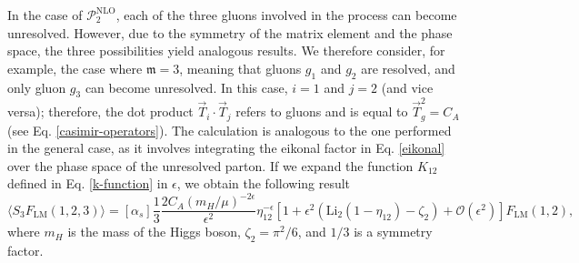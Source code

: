 \documentclass[a4paper, 12pt]{book}
\newcommand{\um}{\mathfrak{m}}
\begin{document}
In the case of $\mathcal{P}_{2}^{\mathrm{NLO}}$, each of the three gluons involved in the process can become unresolved. However, due to the symmetry of the matrix element and the phase space, the three possibilities yield analogous results. We therefore consider, for example, the case where $\um=3$, meaning that gluons $g_1$ and $g_2$ are resolved, and only gluon $g_3$ can become unresolved. In this case, $i=1$ and $j=2$ (and vice versa); therefore, the dot product $\vec{T}_i \cdot \vec{T}_j$ refers to gluons and is equal to $\vec{T}_g^2 = C_A$ (see Eq. \ref{casimir-operators}). The calculation is analogous to the one performed in the general case, as it involves integrating the eikonal factor in Eq. \ref{eikonal} over the phase space of the unresolved parton. If we expand the function $K_{12}$ defined in Eq. \ref{k-function} in $\epsilon$, we obtain the following result
\begin{equation}
  \langle S_3 F_\mathrm{LM}(1,2,3) \rangle = [\alpha_s] \frac{1}{3} \frac{2 C_A (m_H/\mu)^{-2 \epsilon}}{\epsilon^2} \eta_{12}^{-\epsilon}[1+\epsilon^2(\mathrm{Li}_2(1-\eta_{12})-\zeta_2)+\mathcal{O}(\epsilon^2)]F_\mathrm{LM}(1,2),
\end{equation}
where $m_H$ is the mass of the Higgs boson, $\zeta_2 = \pi^2/6$, and $1/3$ is a symmetry factor. \\


\end{document}
